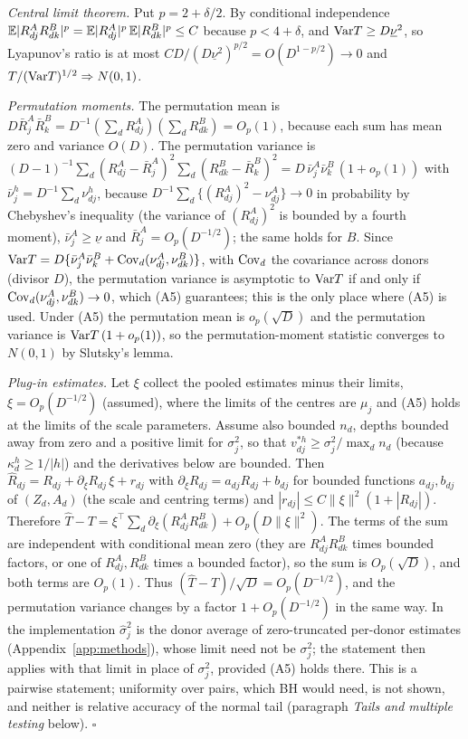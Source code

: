 \emph{Central limit theorem.} Put $p=2+\delta/2$. By conditional independence $\mathbb{E}|R^A_{dj}R^B_{dk}|^p=\mathbb{E}|R^A_{dj}|^p\,\mathbb{E}|R^B_{dk}|^p\le C$ because $p<4+\delta$, and $\mathrm{Var} T\ge D\underline\nu^2$, so Lyapunov's ratio is at most $CD/(D\underline\nu^2)^{p/2}=O(D^{1-p/2})\to0$ and $T/(\mathrm{Var} T)^{1/2}\Rightarrow N(0,1)$.

\emph{Permutation moments.} The permutation mean is $D\bar R^A_j\bar R^B_k=D^{-1}(\sum_dR^A_{dj})(\sum_dR^B_{dk})=O_p(1)$, because each sum has mean zero and variance $O(D)$. The permutation variance is $(D-1)^{-1}\sum_d(R^A_{dj}-\bar R^A_j)^2\sum_d(R^B_{dk}-\bar R^B_k)^2=D\,\bar\nu^A_j\bar\nu^B_k\,(1+o_p(1))$ with $\bar\nu^h_j=D^{-1}\sum_d\nu^h_{dj}$, because $D^{-1}\sum_d\{(R^A_{dj})^2-\nu^A_{dj}\}\to0$ in probability by Chebyshev's inequality (the variance of $(R^A_{dj})^2$ is bounded by a fourth moment), $\bar\nu^A_j\ge\underline\nu$ and $\bar R^A_j=O_p(D^{-1/2})$; the same holds for $B$. Since $\mathrm{Var} T=D\{\bar\nu^A_j\bar\nu^B_k+\mathrm{Cov}_d(\nu^A_{dj},\nu^B_{dk})\}$, with $\mathrm{Cov}_d$ the covariance across donors (divisor $D$), the permutation variance is asymptotic to $\mathrm{Var} T$ if and only if $\mathrm{Cov}_d(\nu^A_{dj},\nu^B_{dk})\to0$, which (A5) guarantees; this is the only place where (A5) is used. Under (A5) the permutation mean is $o_p(\sqrt D)$ and the permutation variance is $\mathrm{Var} T\,(1+o_p(1))$, so the permutation-moment statistic converges to $N(0,1)$ by Slutsky's lemma.

\emph{Plug-in estimates.} Let $\xi$ collect the pooled estimates minus their limits, $\xi=O_p(D^{-1/2})$ (assumed), where the limits of the centres are $\mu_j$ and (A5) holds at the limits of the scale parameters. Assume also bounded $n_d$, depths bounded away from zero and a positive limit for $\sigma_j^2$, so that $v^{*h}_{dj}\ge\sigma_j^2/\max_dn_d$ (because $\kappa^h_d\ge1/|h|$) and the derivatives below are bounded. Then $\hat R_{dj}=R_{dj}+\partial_\xi R_{dj}\,\xi+r_{dj}$ with $\partial_\xi R_{dj}=a_{dj}R_{dj}+b_{dj}$ for bounded functions $a_{dj},b_{dj}$ of $(Z_d,A_d)$ (the scale and centring terms) and $|r_{dj}|\le C\|\xi\|^2(1+|R_{dj}|)$. Therefore $\hat T-T=\xi^\top\sum_d\partial_\xi(R^A_{dj}R^B_{dk})+O_p(D\|\xi\|^2)$. The terms of the sum are independent with conditional mean zero (they are $R^A_{dj}R^B_{dk}$ times bounded factors, or one of $R^A_{dj},R^B_{dk}$ times a bounded factor), so the sum is $O_p(\sqrt D)$, and both terms are $O_p(1)$. Thus $(\hat T-T)/\sqrt D=O_p(D^{-1/2})$, and the permutation variance changes by a factor $1+O_p(D^{-1/2})$ in the same way. In the implementation $\hat\sigma^2_j$ is the donor average of zero-truncated per-donor estimates (Appendix~\ref{app:methods}), whose limit need not be $\sigma_j^2$; the statement then applies with that limit in place of $\sigma_j^2$, provided (A5) holds there. This is a pairwise statement; uniformity over pairs, which BH would need, is not shown, and neither is relative accuracy of the normal tail (paragraph \emph{Tails and multiple testing} below). $\square$


